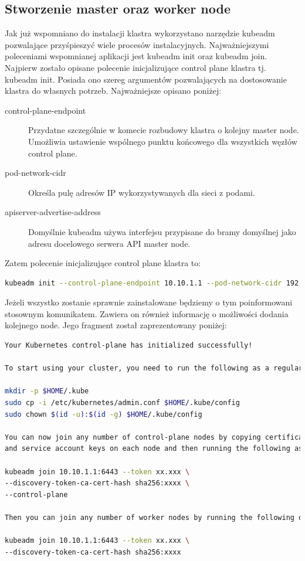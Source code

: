\documentclass[pl,final,oneside]{mgr} %
\begin{document}
\subsection{Stworzenie master oraz worker node}
Jak już wspomniano do instalacji klastra wykorzystano narzędzie kubeadm pozwalające przyśpieszyć wiele procesów instalacyjnych. Najważniejszymi poleceniami wspomnianej aplikacji jest kubeadm init oraz kubeadm join. Najpierw zostało opisane polecenie inicjalizujące control plane klastra tj. kubeadm init. Posiada ono szereg argumentów pozwalających na dostosowanie klastra do własnych potrzeb. Najważniejsze opisano poniżej:
\begin{description}
	\item[control-plane-endpoint] Przydatne szczególnie w komecie rozbudowy klastra o kolejny master node. Umożliwia ustawienie wspólnego punktu końcowego dla wszystkich węzłów control plane.
	\item[pod-network-cidr] Określa pulę adresów IP wykorzystywanych dla sieci z podami.
	\item[apiserver-advertise-address] Domyślnie kubeadm używa interfejsu przypisane do bramy domyślnej jako adresu docelowego serwera API master node.
\end{description}
Zatem polecenie inicjalizujące control plane klastra to: 
\begin{lstlisting}[language=Bash]
kubeadm init --control-plane-endpoint 10.10.1.1 --pod-network-cidr 192.168.0.0/18 --apiserver-advertise-address 10.10.1.1
\end{lstlisting}
Jeżeli wszystko zostanie sprawnie zainstalowane będziemy o tym poinformowani stosownym komunikatem. Zawiera on również informację o możliwości dodania kolejnego node. Jego fragment został zaprezentowany poniżej:

\begin{lstlisting}[language=Bash]
Your Kubernetes control-plane has initialized successfully!

To start using your cluster, you need to run the following as a regular user:

mkdir -p $HOME/.kube
sudo cp -i /etc/kubernetes/admin.conf $HOME/.kube/config
sudo chown $(id -u):$(id -g) $HOME/.kube/config

You can now join any number of control-plane nodes by copying certificate authorities
and service account keys on each node and then running the following as root:

kubeadm join 10.10.1.1:6443 --token xx.xxx \
--discovery-token-ca-cert-hash sha256:xxxx \
--control-plane 

Then you can join any number of worker nodes by running the following on each as root:

kubeadm join 10.10.1.1:6443 --token xx.xxx \
--discovery-token-ca-cert-hash sha256:xxxx
\end{lstlisting}
\end{document}
